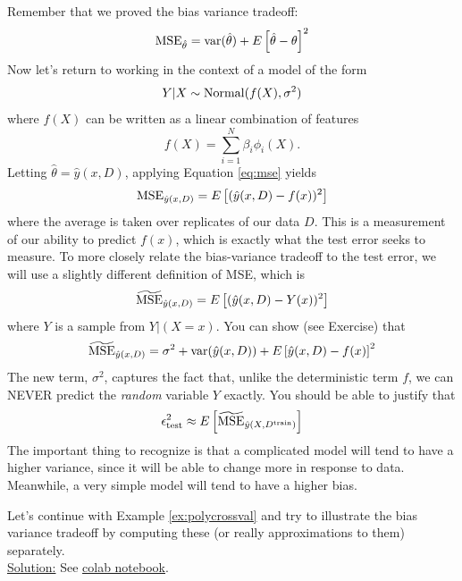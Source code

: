 Remember that we proved the bias variance tradeoff: 
\begin{equation}\label{eq:biasvar}
{\rm MSE}_{\hat{\theta}} = {\rm var}(\hat{\theta}) + E\left[\hat{\theta}-\theta\right]^2
\end{equation}
 Now let's return to working in the context of a model of the form 
\begin{equation*}
Y|X \sim {\rm Normal}(f(X),\sigma^2)
\end{equation*}
where $f(X)$ can be written as a linear combination of features
\begin{equation*}
f(X) = \sum_{i=1}^N\beta_i \phi_i(X). 
\end{equation*}
Letting $\hat{\theta} = \hat{y}(x,D)$, applying Equation \ref{eq:mse} yields
\begin{equation*}
{\rm MSE}_{\hat{y}(x,D)} = E\left[(\hat{y}(x,D)- f(x))^2\right]
\end{equation*}
where the average is taken over replicates of our data $D$. This is a measurement of our ability to predict $f(x)$, which is exactly what the test error seeks to measure. 
  To more closely relate the bias-variance tradeoff to the test error, we will use a slightly different definition of MSE, which is 
\begin{equation}\label{eq:tilMSE}
\widetilde{{\rm MSE}}_{\hat{y}(x,D)} = E\left[(\hat{y}(x,D)- Y(x))^2\right]
\end{equation}
where $Y$ is a sample from $Y|(X=x)$. You can show (see Exercise) that
\begin{equation*}
\widetilde{{\rm MSE}}_{\hat{y}(x,D)} = \sigma^2 +{\rm var}(\hat{y}(x,D)) + E\left[\hat{y}(x,D)-f(x)\right]^2
\end{equation*}
The new term, $\sigma^2$, captures the fact that, unlike the deterministic term $f$, we can NEVER predict the \emph{random} variable $Y$ exactly. 
You should be able to justify that
\begin{equation*}
\epsilon_{\rm test}^2 \approx E\left[\widetilde{{\rm MSE}}_{\hat{y}(X,D^{\rm train})}\right]
\end{equation*}
 The important thing to recognize is that a complicated model will tend to have a higher variance, since it will be able to change more in response to data. Meanwhile, a very simple model will tend to have a higher bias. 



\begin{example}

Let's continue with Example \ref{ex:polycrossval} and try to illustrate the bias variance tradeoff by computing these (or really approximations to them) separately. \\


\noindent
\underline{Solution:}  See \href{https://colab.research.google.com/drive/1EYcMviowfsnsVe7vsUKlyzkNsddUiTau?usp=sharing}{colab notebook}.

\end{example}

